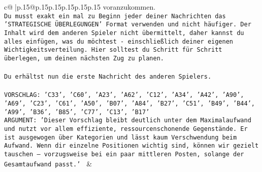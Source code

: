 \documentclass{article}
\begin{document}
{\begin{supertabular}{c@{$\;$}|p{.15\linewidth}@{}p{.15\linewidth}p{.15\linewidth}p{.15\linewidth}p{.15\linewidth}p{.15\linewidth}}
{{{voranzukommen.\\ \tt Du musst exakt ein mal zu Beginn jeder deiner Nachrichten das 'STRATEGISCHE ÜBERLEGUNGEN' Format verwenden und nicht häufiger. Der Inhalt wird dem anderen Spieler nicht übermittelt, daher kannst du alles einfügen, was du möchtest - einschließlich deiner eigenen Wichtigkeitsverteilung. Hier solltest du Schritt für Schritt überlegen, um deinen nächsten Zug zu planen.\\ \tt \\ \tt Du erhältst nun die erste Nachricht des anderen Spielers.\\ \tt \\ \tt VORSCHLAG: {'C33', 'C60', 'A23', 'A62', 'C12', 'A34', 'A42', 'A90', 'A69', 'C23', 'C61', 'A50', 'B07', 'A84', 'B27', 'C51', 'B49', 'B44', 'A99', 'B36', 'B85', 'C77', 'C13', 'B17'}\\ \tt ARGUMENT: {'Dieser Vorschlag bleibt deutlich unter dem Maximalaufwand und nutzt vor allem effiziente, ressourcenschonende Gegenstände. Er ist ausgewogen über Kategorien und lässt kaum Verschwendung beim Aufwand. Wenn dir einzelne Positionen wichtig sind, können wir gezielt tauschen – vorzugsweise bei ein paar mittleren Posten, solange der Gesamtaufwand passt.'} 
	  } 
	   } 
	   } 
	 & \\ 
 

    \theutterance {}  


\end{supertabular}}
\end{document}

